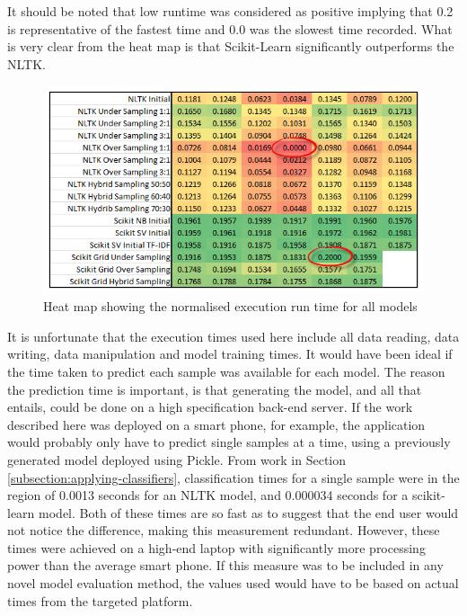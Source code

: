 It should be noted that low runtime was considered as positive  implying that 0.2 is representative of the fastest time and 0.0 was the slowest time recorded. What is very clear from the heat map is that Scikit-Learn significantly outperforms the NLTK.

\begin{figure}[htbp]
	\centering
	\includegraphics[width=1\textwidth]{Figures/Chapter5/best_model_02.jpg}
	\caption[Best Model - Normalised execution heat map]{Heat map showing the normalised execution run time for all models}
	\label{fig:best_model_02}
\end{figure}

It is unfortunate that the execution times used here include all data reading, data writing, data manipulation and model training times. It would have been ideal if the time taken to predict each sample was available for each model. The reason the prediction time is important, is that generating the model, and all that entails, could be done on a high specification back-end server. If the work described here was deployed on a smart phone, for example, the application would probably only have to predict single samples at a time, using a previously generated model deployed using Pickle. From work in Section \ref{subsection:applying-classifiers}, classification times for a single sample were in the region of 0.0013 seconds for an NLTK model, and 0.000034 seconds for a scikit-learn model. Both of these times are so fast as to suggest that the end user would not notice the difference, making this measurement redundant. However, these times were achieved on a high-end laptop with significantly more processing power than the average smart phone. If this measure was to be included in any novel model evaluation method, the values used would have to be based on actual times from the targeted platform.

